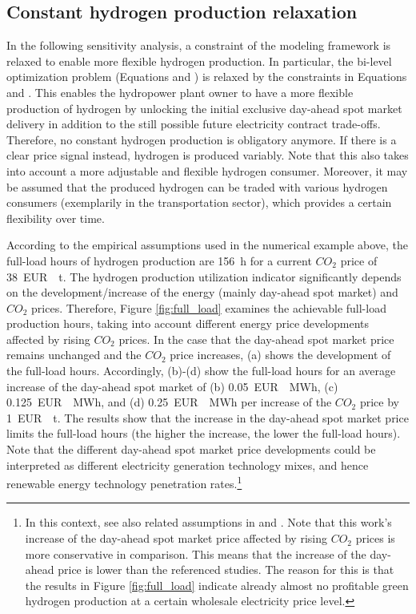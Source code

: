 \documentclass[review]{elsarticle}
\begin{document}
\subsection{Constant hydrogen production relaxation}\label{res:4:relax}
In the following sensitivity analysis, a constraint of the modeling framework is relaxed to enable more flexible hydrogen production. In particular, the bi-level optimization problem (Equations  and ) is relaxed by the constraints in Equations  and . This enables the hydropower plant owner to have a more flexible production of hydrogen by unlocking the initial exclusive day-ahead spot market delivery in addition to the still possible future electricity contract trade-offs. Therefore, no constant hydrogen production is obligatory anymore. If there is a clear price signal instead, hydrogen is produced variably. Note that this also takes into account a more adjustable and flexible hydrogen consumer. Moreover, it may be assumed that the produced hydrogen can be traded with various hydrogen consumers (exemplarily in the transportation sector), which provides a certain flexibility over time.\vspace{0.3cm}

According to the empirical assumptions used in the numerical example above, the full-load hours of hydrogen production are \SI{156}{\hour} for a current $CO_2$ price of \SI{38}{EUR \per \tonne}. The hydrogen production utilization indicator significantly depends on the development/increase of the energy (mainly day-ahead spot market) and $CO_2$ prices. Therefore, Figure \ref{fig:full_load} examines the achievable full-load production hours, taking into account different energy price developments affected by rising $CO_2$ prices. In the case that the day-ahead spot market price remains unchanged and the $CO_2$ price increases, (a) shows the development of the full-load hours. Accordingly, (b)-(d) show the full-load hours for an average increase of the day-ahead spot market of (b) \SI{0.05}{EUR \per MWh}, (c) \SI{0.125}{EUR \per MWh}, and (d) \SI{0.25}{EUR \per MWh}  per increase of the $CO_2$ price by \SI{1}{EUR \per \tonne}. The results show that the increase in the day-ahead spot market price limits the full-load hours (the higher the increase, the lower the full-load hours). Note that the different day-ahead spot market price developments could be interpreted as different electricity generation technology mixes, and hence renewable energy technology penetration rates.\footnote{In this context, see also related assumptions in \cite{breitschopf2016prices} and \cite{fina2019profitability}. Note that this work's increase of the day-ahead spot market price affected by rising $CO_2$ prices is more conservative in comparison. This means that the increase of the day-ahead price is lower than the referenced studies. The reason for this is that the results in Figure \ref{fig:full_load} indicate already almost no profitable green hydrogen production at a certain wholesale electricity price level.}
\end{document}
